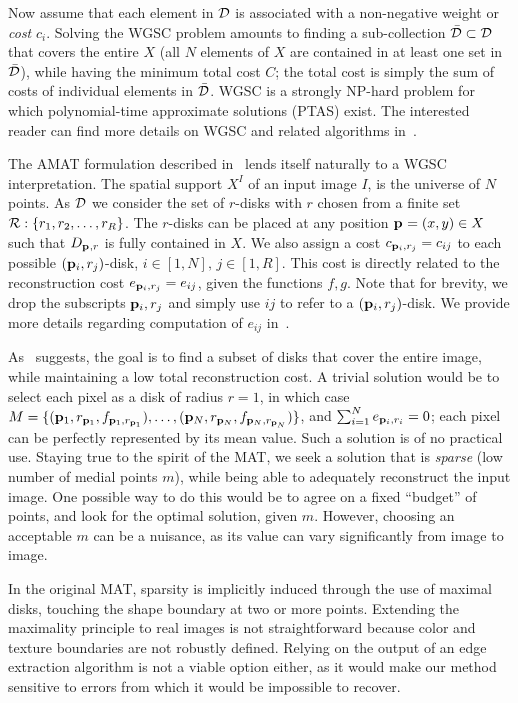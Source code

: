 \documentclass[10pt,twocolumn,letterpaper]{article}
\begin{document}
Now assume that each element in $\mathcal{D}$ is associated with a non-negative weight or \emph{cost} $c_i$.
Solving the WGSC problem amounts to finding a sub-collection $\bar{\mathcal{D}} \subset \mathcal{D}$ that covers the entire $X$
(all $N$ elements of $X$ are contained in at least one set in $\bar{\mathcal{D}}$), while having the minimum
total cost $C$; the total cost is simply the sum of costs of individual elements in $\bar{\mathcal{D}}$.
WGSC is a strongly NP-hard problem for which polynomial-time approximate solutions (PTAS) exist.
The interested reader can find more details on WGSC and related algorithms 
in~\cite{mustafa2015quasi,varadarajan2010weighted,har2012weighted,chan2012weighted}.

The AMAT formulation described in~ lends itself naturally to a 
WGSC interpretation.
The spatial support $X^I$ of an input image $I$, is the universe of $N$ points.
As $\mathcal{D}$ we consider the set of $r$-disks with $r$ chosen from a finite set $\mathcal{R}:\{r_1,r_2,\ldots,r_R\}$.
The $r$-disks can be placed at any position $\mathbf{p}_{}=(x,y)\in X$ such that $D_{\mathbf{p}_{},r}$ is fully contained in $X$.
We also assign a cost $c_{\mathbf{p}_{i},r_j} = c_{ij}$ to each possible $(\mathbf{p}_{i},r_j)$-disk, $i\in[1,N],\, j\in[1,R]$.
This cost is directly related to the reconstruction cost 
$e_{\mathbf{p}_{i},r_j} = e_{ij}$, given the functions $f,g$.
Note that for brevity, we drop the subscripts $\mathbf{p}_{i},r_j$ and simply use $ij$ to refer to a $(\mathbf{p}_{i},r_j)$-disk.
We provide more details regarding computation of $e_{ij}$ in~.

As~ suggests, the goal is to find a subset of disks that cover the entire image, while maintaining
a low total reconstruction cost. 
A trivial solution would be to select each pixel as a disk of radius $r=1$, in which case
$M=\{ (\mathbf{p}_{1},r_{\mathbf{p}_{1}},f_{\mathbf{p}_{1},r_{\mathbf{p}_{1}}}), \ldots, ( \mathbf{p}_{N},r_{\mathbf{p}_{N}},f_{\mathbf{p}_{N},r_{\mathbf{p}_{N}}} ) \}$,
and $\sum_{i=1}^N e_{\mathbf{p}_{i},r_i} = 0$; each pixel can be perfectly represented by its mean value.
Such a solution is of no practical use. 
Staying true to the spirit of the MAT, we seek a solution that is \emph{sparse}
(low number of medial points $m$), while being able to adequately reconstruct the input image.
One possible way to do this would be to agree on a fixed ``budget'' of points, and look for the 
optimal solution, given $m$.
However, choosing an acceptable $m$ can be a nuisance, as its value can vary significantly  from image to image.

In the original MAT, sparsity is implicitly induced through the use of maximal disks,
touching the shape boundary at two or more  points.
Extending the maximality principle to real images is not straightforward
because color and texture boundaries are not robustly defined.
Relying on the output of an edge extraction algorithm is not a viable option either,
as it would make our method sensitive to errors from which it would be impossible to recover.
\end{document}

